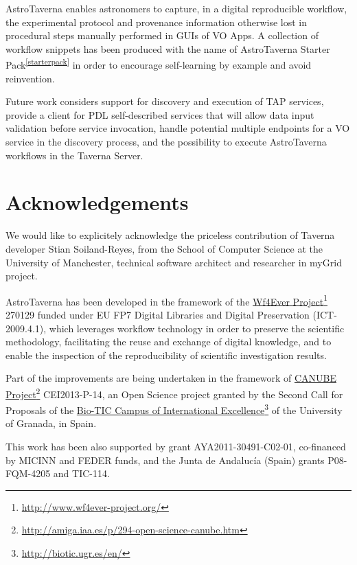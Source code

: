 \documentclass[final,authoryear,5p,times,twocolumn]{elsarticle}
\newcommand{\urlsamefont}[1]{\urlstyle{same}\url{#1}}
\newcommand{\hrefnote}[2]{\href{#1}{#2}\footnote{\urlsamefont{#1}}}
\begin{document}
AstroTaverna  enables astronomers to capture, in a digital reproducible workflow, the experimental protocol and provenance information otherwise lost in procedural steps manually performed in GUIs of VO Apps. A collection of workflow snippets has been produced with the name of AstroTaverna Starter Pack\textsuperscript{\ref{starterpack}} in order to encourage self-learning by example and avoid reinvention.

Future work considers support for discovery and execution of TAP services, provide a client for PDL self-described services that will allow data input validation before service invocation, handle potential multiple endpoints for a VO service in the discovery process, and the possibility to execute AstroTaverna workflows in the Taverna Server.

\section{Acknowledgements}
\label{Acknowledgements}
We would like to explicitely acknowledge the priceless contribution of Taverna developer Stian Soiland-Reyes, from the School of Computer Science at the University of Manchester, technical software architect and researcher in myGrid project. 

AstroTaverna has been developed in the framework of the \hrefnote{http://www.wf4ever-project.org/}{Wf4Ever Project} 270129 funded under EU FP7 Digital Libraries and Digital Preservation (ICT-2009.4.1), which leverages workflow technology in order to preserve the scientific methodology, facilitating the reuse and exchange of digital knowledge, and to enable the inspection of the reproducibility of scientific investigation results.

Part of the improvements are being undertaken in the framework of \hrefnote{http://amiga.iaa.es/p/294-open-science-canube.htm}{CANUBE Project} CEI2013-P-14, an Open Science project granted by the Second Call for Proposals of the \hrefnote{http://biotic.ugr.es/en/}{Bio-TIC Campus of International Excellence} of the University of Granada, in Spain.

This work has been also supported by grant AYA2011-30491-C02-01, co-financed by MICINN and FEDER funds, and the Junta de Andalucía (Spain) grants P08-FQM-4205 and TIC-114.



\end{document}
